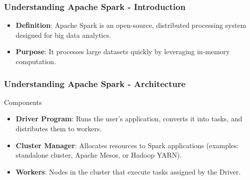 \documentclass{beamer}
\begin{document}
\begin{frame}[fragile]
    \frametitle{Understanding Apache Spark - Introduction}
    \begin{itemize}
        \item \textbf{Definition}: Apache Spark is an open-source, distributed processing system designed for big data analytics. 
        \item \textbf{Purpose}: It processes large datasets quickly by leveraging in-memory computation.
    \end{itemize}
\end{frame}

\begin{frame}[fragile]
    \frametitle{Understanding Apache Spark - Architecture}
    \begin{block}{Components}
        \begin{itemize}
            \item \textbf{Driver Program}: Runs the user’s application, converts it into tasks, and distributes them to workers.
            \item \textbf{Cluster Manager}: Allocates resources to Spark applications (examples: standalone cluster, Apache Mesos, or Hadoop YARN).
            \item \textbf{Workers}: Nodes in the cluster that execute tasks assigned by the Driver.
        \end{itemize}
    \end{block}
\end{frame}
\end{document}
